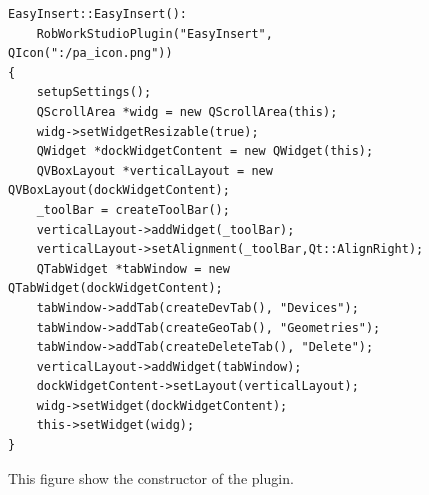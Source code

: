\begin{figure}[h] %
\centering
\lstset{language=C++} 
\begin{lstlisting}[frame=single]  
EasyInsert::EasyInsert():
    RobWorkStudioPlugin("EasyInsert", QIcon(":/pa_icon.png"))
{
    setupSettings();
    QScrollArea *widg = new QScrollArea(this);
	widg->setWidgetResizable(true);
	QWidget *dockWidgetContent = new QWidget(this);
	QVBoxLayout *verticalLayout = new QVBoxLayout(dockWidgetContent);
    _toolBar = createToolBar();
    verticalLayout->addWidget(_toolBar);
    verticalLayout->setAlignment(_toolBar,Qt::AlignRight);
    QTabWidget *tabWindow = new QTabWidget(dockWidgetContent);
    tabWindow->addTab(createDevTab(), "Devices");
    tabWindow->addTab(createGeoTab(), "Geometries");
    tabWindow->addTab(createDeleteTab(), "Delete");
    verticalLayout->addWidget(tabWindow);
    dockWidgetContent->setLayout(verticalLayout);
    widg->setWidget(dockWidgetContent);
	this->setWidget(widg);
}
\end{lstlisting}
\caption{This figure show the constructor of the plugin.}
\label{fig:eiClass} 	
\end{figure}

%
%
%
%

